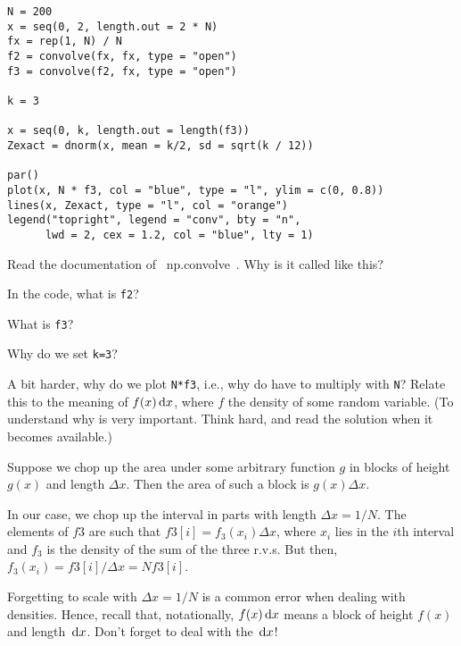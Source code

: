 \documentclass[assignments]{subfiles}
\begin{document}
\begin{verbatim}
N = 200
x = seq(0, 2, length.out = 2 * N)
fx = rep(1, N) / N
f2 = convolve(fx, fx, type = "open")
f3 = convolve(f2, fx, type = "open")

k = 3

x = seq(0, k, length.out = length(f3))
Zexact = dnorm(x, mean = k/2, sd = sqrt(k / 12))

par()
plot(x, N * f3, col = "blue", type = "l", ylim = c(0, 0.8))
lines(x, Zexact, type = "l", col = "orange")
legend("topright", legend = "conv", bty = "n",
      lwd = 2, cex = 1.2, col = "blue", lty = 1)
\end{verbatim}

\begin{exercise}
Read the documentation of ~np.convolve~. Why is it called like this?
\end{exercise}

\begin{exercise}
In the code, what is \texttt{f2}?
\end{exercise}

\begin{exercise}
What is \texttt{f3}?
\end{exercise}

\begin{exercise}
Why do we set \texttt{k=3}?
\end{exercise}

\begin{exercise}
A bit harder, why do we plot \texttt{N*f3}, i.e., why do have to multiply with \texttt{N}? Relate this to the meaning of $f(x)\,\textrm{d}x$, where $f$ the density of some random variable.
(To understand why is very important. Think hard, and read the solution when it becomes available.)
\begin{solution}
  Suppose we chop up the area under some arbitrary  function $g$ in blocks of height $g(x)$ and length $\Delta x$.
  Then the area of such a block is $g(x) \Delta x$.


  In our case, we chop up the interval in parts with length $\Delta x = 1/N$.
  The elements of $f3$ are such that $f3[i] = f_{3}(x_{i}) \Delta x$, where $x_{i}$ lies in the $i$th interval and $f_{3}$ is the density of the sum of the three r.v.s. But then, $f_{3}(x_{i}) = f3[i]/\Delta x = N f3[i]$.

  Forgetting to scale with $\Delta x = 1/N$ is a common error when dealing with densities.
  Hence, recall that, notationally, $f(x) \,\textrm{d}x$ means a block of height $f(x)$ and length $\,\textrm{d}x$. Don't forget to deal with the $\,\textrm{d}x$!
\end{solution}
\end{exercise}
\end{document}
